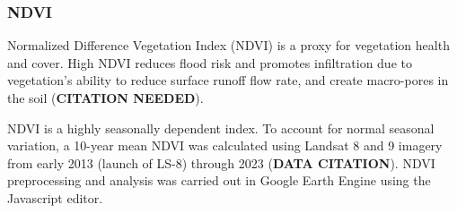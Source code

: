 \documentclass[
]{agujournal2019}
\begin{document}
\subsubsection{NDVI}\label{ndvi}

Normalized Difference Vegetation Index (NDVI) is a proxy for vegetation
health and cover. High NDVI reduces flood risk and promotes infiltration
due to vegetation's ability to reduce surface runoff flow rate, and
create macro-pores in the soil (\textbf{CITATION NEEDED}).

NDVI is a highly seasonally dependent index. To account for normal
seasonal variation, a 10-year mean NDVI was calculated using Landsat 8
and 9 imagery from early 2013 (launch of LS-8) through 2023
(\textbf{DATA CITATION}). NDVI preprocessing and analysis was carried
out in Google Earth Engine using the Javascript editor.
\end{document}
